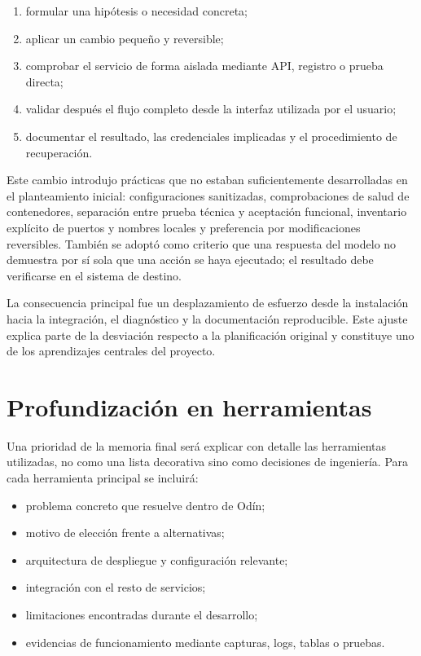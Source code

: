 \begin{enumerate}
  \item formular una hipótesis o necesidad concreta;
  \item aplicar un cambio pequeño y reversible;
  \item comprobar el servicio de forma aislada mediante API, registro o prueba directa;
  \item validar después el flujo completo desde la interfaz utilizada por el usuario;
  \item documentar el resultado, las credenciales implicadas y el procedimiento de recuperación.
\end{enumerate}

Este cambio introdujo prácticas que no estaban suficientemente desarrolladas en el planteamiento inicial: configuraciones sanitizadas, comprobaciones de salud de contenedores, separación entre prueba técnica y aceptación funcional, inventario explícito de puertos y nombres locales y preferencia por modificaciones reversibles. También se adoptó como criterio que una respuesta del modelo no demuestra por sí sola que una acción se haya ejecutado; el resultado debe verificarse en el sistema de destino.

La consecuencia principal fue un desplazamiento de esfuerzo desde la instalación hacia la integración, el diagnóstico y la documentación reproducible. Este ajuste explica parte de la desviación respecto a la planificación original y constituye uno de los aprendizajes centrales del proyecto.

\section{Profundización en herramientas}
Una prioridad de la memoria final será explicar con detalle las herramientas utilizadas, no como una lista decorativa sino como decisiones de ingeniería. Para cada herramienta principal se incluirá:
\begin{itemize}
  \item problema concreto que resuelve dentro de Odín;
  \item motivo de elección frente a alternativas;
  \item arquitectura de despliegue y configuración relevante;
  \item integración con el resto de servicios;
  \item limitaciones encontradas durante el desarrollo;
  \item evidencias de funcionamiento mediante capturas, logs, tablas o pruebas.
\end{itemize}
